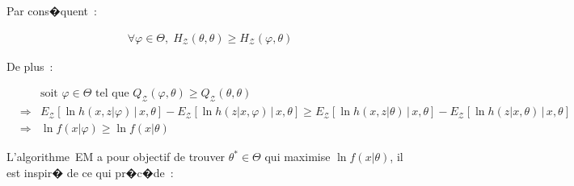 Par cons�quent~:

        \begin{eqnarray}
        \forall\varphi\in\Theta,\; H_{\mathcal{Z}}\left(  \theta,\theta\right) \geqslant H_{\mathcal{Z}}\left(
        \varphi,\theta\right) \label{hmm_eq_em_jensen}
        \end{eqnarray}

De plus~:

        \begin{eqnarray}
        && \text{soit } \varphi\in\Theta \text { tel que } Q_{\mathcal{Z} }\left(  \varphi,\theta\right)  
                        \geqslant Q_{\mathcal{Z}}\left(  \theta ,\theta\right)
                        \nonumber\\
        & \Longrightarrow & E_{\mathcal{Z}}\left[  \ln h\left(  x,z\left|  \varphi \right.  \right)  \,\left| 
                 \,x,\theta\right.  \right]  -E_{\mathcal{Z}
            }\left[  \ln h\left(  z\left|  x,\varphi\right.  \right)  \,\left| \,x,\theta\right.  \right]  \geqslant
                 E_{\mathcal{Z}}\left[  \ln h\left(
            x,z\left|  \theta\right.  \right)  \,\left|  \,x,\theta\right.  \right] -E_{\mathcal{Z}}\left[  \ln h\left(  
                z\left|  x,\theta\right.  \right)
            \,\left|  \,x,\theta\right.  \right] \nonumber \\
        & \Longrightarrow & \ln f\left(  x\left|  \varphi\right.  \right)  \geqslant\ln f\left(  x\left|  \theta\right.  
                \right) \label{hmm_eq_em_jensen_2}
        \end{eqnarray}


L'algorithme~EM a pour objectif de trouver $\theta^{\ast}\in\Theta$ qui maximise $\ln f\left(  x\left|  \theta\right.  \right)  $, il est inspir� de ce qui pr�c�de~:

